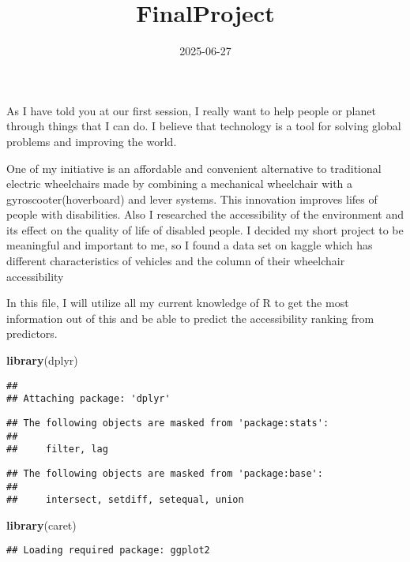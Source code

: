 \documentclass[
]{article}
\title{FinalProject}
\author{}
\date{\vspace{-2.5em}2025-06-27}
\newenvironment{Shaded}{\begin{snugshade}}{\end{snugshade}}
\newcommand{\FunctionTok}[1]{\textcolor[rgb]{0.13,0.29,0.53}{\textbf{#1}}}
\newcommand{\NormalTok}[1]{#1}
\begin{document}
\maketitle

As I have told you at our first session, I really want to help people or
planet through things that I can do. I believe that technology is a tool
for solving global problems and improving the world.

One of my initiative is an affordable and convenient alternative to
traditional electric wheelchairs made by combining a mechanical
wheelchair with a gyroscooter(hoverboard) and lever systems. This
innovation improves lifes of people with disabilities. Also I researched
the accessibility of the environment and its effect on the quality of
life of disabled people. I decided my short project to be meaningful and
important to me, so I found a data set on kaggle which has different
characteristics of vehicles and the column of their wheelchair
accessibility

In this file, I will utilize all my current knowledge of R to get the
most information out of this and be able to predict the accessibility
ranking from predictors.

\begin{Shaded}
\begin{Highlighting}[]
\FunctionTok{library}\NormalTok{(dplyr)}
\end{Highlighting}
\end{Shaded}

\begin{verbatim}
## 
## Attaching package: 'dplyr'
\end{verbatim}

\begin{verbatim}
## The following objects are masked from 'package:stats':
## 
##     filter, lag
\end{verbatim}

\begin{verbatim}
## The following objects are masked from 'package:base':
## 
##     intersect, setdiff, setequal, union
\end{verbatim}

\begin{Shaded}
\begin{Highlighting}[]
\FunctionTok{library}\NormalTok{(caret)}
\end{Highlighting}
\end{Shaded}

\begin{verbatim}
## Loading required package: ggplot2
\end{verbatim}
\end{document}
